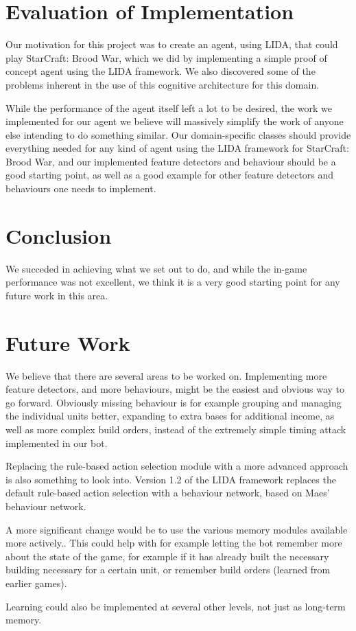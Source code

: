 \section{Evaluation of Implementation}
\label{sec:evalres}
Our motivation for this project was to create an agent, using LIDA, that could play StarCraft: Brood War, which we did by implementing a simple proof of concept agent using the LIDA framework. We also discovered some of the problems inherent in the use of this cognitive architecture for this domain.

While the performance of the agent itself left a lot to be desired, the work we implemented for our agent we believe will massively simplify the work of anyone else intending to do something similar. Our domain-specific classes should provide everything needed for any kind of agent using the LIDA framework for StarCraft: Brood War, and our implemented feature detectors and behaviour should be a good starting point, as well as a good example for other feature detectors and behaviours one needs to implement.

\section{Conclusion}
\label{sec:conclusion}
We succeded in achieving what we set out to do, and while the in-game performance was not excellent, we think it is a very good starting point for any future work in this area.

\section{Future Work}
\label{sec:futurework}
We believe that there are several areas to be worked on. Implementing more feature detectors, and more behaviours, might be the easiest and obvious way to go forward. Obviously missing behaviour is for example grouping and managing the individual units better, expanding to extra bases for additional income, as well as more complex build orders, instead of the extremely simple timing attack implemented in our bot.

Replacing the rule-based action selection module with a more advanced approach is also something to look into. Version 1.2 of the LIDA framework replaces the default rule-based action selection with a behaviour network, based on Maes' behaviour network.\cite{maes1989right}

A more significant change would be to use the various memory modules available more actively.\cite{franklin2007lida}. This could help with for example letting the bot remember more about the state of the game, for example if it has already built the necessary building necessary for a certain unit, or remember build orders (learned from earlier games).

Learning could also be implemented at several other levels, not just as long-term memory.
